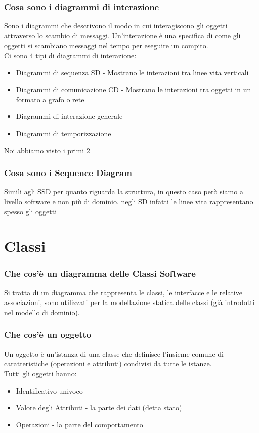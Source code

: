\documentclass[12pt, a4paper, openany]{book}
\begin{document}
\subsection*{Cosa sono i diagrammi di interazione}
Sono i diagrammi che descrivono il modo in cui interagiscono gli oggetti
attraverso lo scambio di messaggi. Un'interazione è una specifica di come gli oggetti
si scambiano messaggi nel tempo per eseguire un compito.\\
Ci sono 4 tipi di diagrammi di interazione:
\begin{itemize}
    \item Diagrammi di sequenza SD - Mostrano le interazioni tra linee vita verticali
    \item Diagrammi di comunicazione CD - Mostrano le interazioni tra oggetti in un formato a grafo o rete
    \item Diagrammi di interazione generale
    \item Diagrammi di temporizzazione
\end{itemize}
Noi abbiamo visto i primi 2

\subsection*{Cosa sono i Sequence Diagram}
Simili agli SSD per quanto riguarda la struttura, in questo caso però siamo a livello
software e non più di dominio. negli SD infatti le linee vita rappresentano spesso 
gli oggetti

\chapter{Classi}

\subsection*{Che cos'è un diagramma delle Classi Software}
Si tratta di un diagramma che rappresenta le classi, le interfacce e le relative associazioni,
sono utilizzati per la modellazione statica delle classi (già introdotti nel modello di
dominio).

\subsection*{Che cos'è un oggetto}
Un oggetto è un'istanza di una classe che definisce l'insieme comune di
caratteristiche (operazioni e attributi) condivisi da tutte le istanze.\\
Tutti gli oggetti hanno:
\begin{itemize}
    \item Identificativo univoco
    \item Valore degli Attributi - la parte dei dati (detta stato)
    \item Operazioni - la parte del comportamento
\end{itemize}
\end{document}
